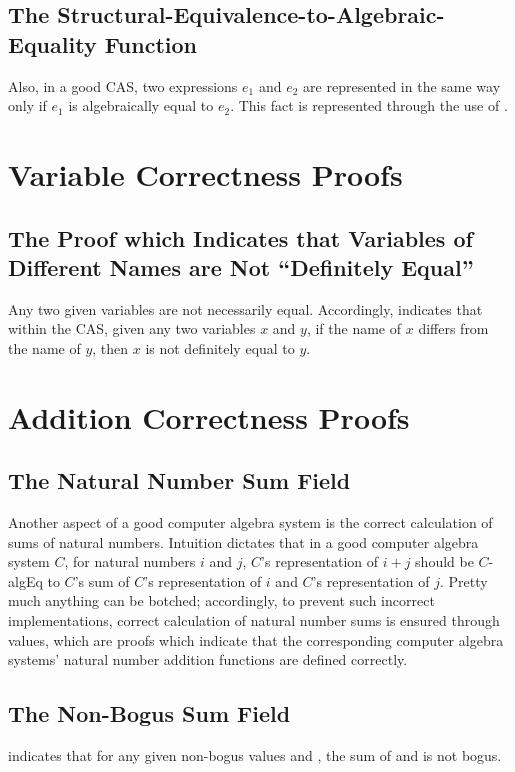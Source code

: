 \documentclass{report}
\begin{document}
\subsection{The Structural-Equivalence-to-Algebraic-Equality Function}
Also, in a good CAS, two expressions \(e_1\) and \(e_2\) are represented in the same way only if \(e_1\) is algebraically equal to \(e_2\).  This fact is represented through the use of .

\section{Variable Correctness Proofs}

\subsection{The Proof which Indicates that Variables of Different Names are Not ``Definitely Equal''}
Any two given variables are not necessarily equal.  Accordingly,   indicates that within the  CAS, given any two  variables \(x\) and \(y\), if the name of \(x\) differs from the name of \(y\), then \(x\) is not definitely equal to \(y\).

\section{Addition Correctness Proofs}

\subsection{The Natural Number Sum Field}
Another aspect of a good computer algebra system is the correct calculation of sums of natural numbers.  Intuition dictates that in a good computer algebra system \(C\), for natural numbers \(i\) and \(j\), \(C\)'s representation of \(i + j\) should be \(C\)-\gls{algEq} to \(C\)'s sum of \(C\)'s representation of \(i\) and \(C\)'s representation of \(j\).  Pretty much anything can be botched; accordingly, to prevent such incorrect implementations, correct calculation of natural number sums is ensured through  values, which are proofs which indicate that the corresponding computer algebra systems' natural number addition functions are defined correctly.

\subsection{The Non-Bogus Sum Field}
 indicates that for any given non-bogus values  and , the sum of  and  is not bogus.
\end{document}
